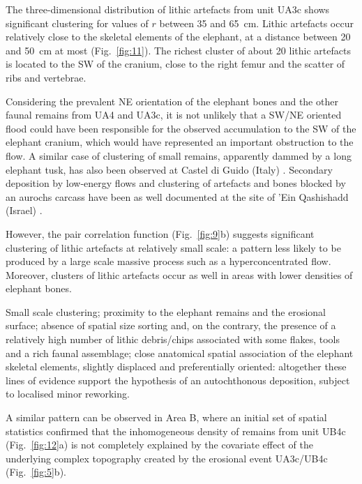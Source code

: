 \documentclass[preprint,authoryear,times]{elsarticle} %
\begin{document}
The three-dimensional distribution of lithic artefacts from unit UA3c shows significant clustering for values of $r$ between 35 and 65~cm. Lithic artefacts occur relatively close to the skeletal elements of the elephant, at a distance between 20 and 50~cm at most (Fig.~\ref{fig:11}). The richest cluster of about 20 lithic artefacts is located to the SW of the cranium, close to the right femur and the scatter of ribs and vertebrae.

Considering the prevalent NE orientation of the elephant bones and the other faunal remains from UA4 and UA3c, it is not unlikely that a SW/NE oriented flood could have been responsible for the observed accumulation to the SW of the elephant cranium, which would have represented an important obstruction to the flow. A similar case of clustering of small remains, apparently dammed by a long elephant tusk, has also been observed at Castel di Guido (Italy) \citep{Boschian2010}. Secondary deposition by low-energy flows and clustering of artefacts and bones blocked by an aurochs carcass have been as well documented at the site of 'Ein Qashishadd (Israel) \citep{Hovers2014}.

However, the pair correlation function (Fig.~\ref{fig:9}b) suggests significant clustering of lithic artefacts at relatively small scale: a pattern less likely to be produced by a large scale massive process such as a hyperconcentrated flow. Moreover, clusters of lithic artefacts occur as well in areas with lower densities of elephant bones.

Small scale clustering; proximity to the elephant remains and the erosional surface; absence of spatial size sorting and, on the contrary, the presence of a relatively high number of lithic debris/chips associated with some flakes, tools and a rich faunal assemblage; close anatomical spatial association of the elephant skeletal elements, slightly displaced and preferentially oriented: altogether these lines of evidence support the hypothesis of an autochthonous deposition, subject to localised minor reworking.


A similar pattern can be observed in Area B, where an initial set of spatial statistics confirmed that the inhomogeneous density of remains from unit UB4c (Fig.~\ref{fig:12}a) is not completely explained by the covariate effect of the underlying complex topography created by the erosional event UA3c/UB4c (Fig.~\ref{fig:5}b).
\end{document}
